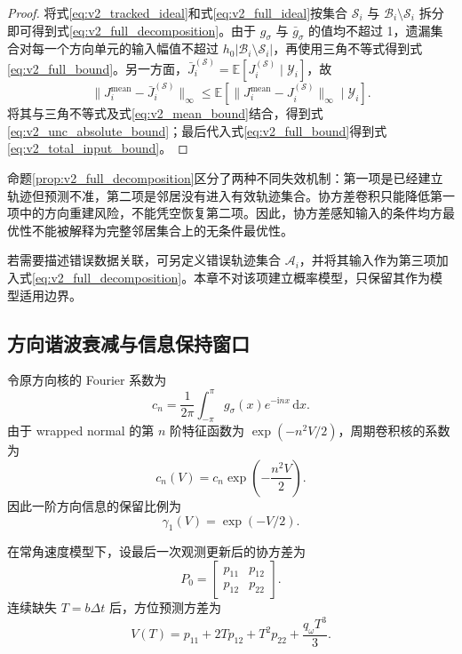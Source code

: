 \documentclass[UTF8,fontset=windows,11pt]{ctexart}
\newcommand{\E}{\mathbb E}
\begin{document}
\begin{proof}
将式\eqref{eq:v2_tracked_ideal}和式\eqref{eq:v2_full_ideal}按集合 $\mathcal S_i$ 与 $\mathcal B_i\setminus\mathcal S_i$ 拆分即可得到式\eqref{eq:v2_full_decomposition}。由于 $g_\sigma$ 与 $\bar g_\sigma$ 的值均不超过 1，遗漏集合对每一个方向单元的输入幅值不超过 $h_0|\mathcal B_i\setminus\mathcal S_i|$，再使用三角不等式得到式\eqref{eq:v2_full_bound}。另一方面，$\bar J_i^{(\mathcal S)}=\E[J_i^{(\mathcal S)}\mid\mathcal Y_i]$，故
\[
 \|J_i^{\mathrm{mean}}-\bar J_i^{(\mathcal S)}\|_\infty
 \le\E[\|J_i^{\mathrm{mean}}-J_i^{(\mathcal S)}\|_\infty\mid\mathcal Y_i].
\]
将其与三角不等式及式\eqref{eq:v2_mean_bound}结合，得到式\eqref{eq:v2_unc_absolute_bound}；最后代入式\eqref{eq:v2_full_bound}得到式\eqref{eq:v2_total_input_bound}。
\end{proof}

命题\ref{prop:v2_full_decomposition}区分了两种不同失效机制：第一项是已经建立轨迹但预测不准，第二项是邻居没有进入有效轨迹集合。协方差卷积只能降低第一项中的方向重建风险，不能凭空恢复第二项。因此，协方差感知输入的条件均方最优性不能被解释为完整邻居集合上的无条件最优性。

若需要描述错误数据关联，可另定义错误轨迹集合 $\mathcal A_i$，并将其输入作为第三项加入式\eqref{eq:v2_full_decomposition}。本章不对该项建立概率模型，只保留其作为模型适用边界。

\subsection{方向谐波衰减与信息保持窗口}

令原方向核的 Fourier 系数为
\begin{equation}
 c_n=\frac{1}{2\pi}\int_{-\pi}^{\pi}g_\sigma(x)e^{-\mathrm inx}\,\mathrm dx .
 \label{eq:v2_fourier_coeff}
\end{equation}
由于 wrapped normal 的第 $n$ 阶特征函数为 $\exp(-n^2V/2)$，周期卷积核的系数为
\begin{equation}
 c_n(V)=c_n\exp\left(-\frac{n^2V}{2}\right).
 \label{eq:v2_harmonic_decay}
\end{equation}
因此一阶方向信息的保留比例为
\begin{equation}
 \gamma_1(V)=\exp(-V/2).
 \label{eq:v2_first_harmonic}
\end{equation}

在常角速度模型下，设最后一次观测更新后的协方差为
\begin{equation}
 P_0=\begin{bmatrix}p_{11}&p_{12}\\p_{12}&p_{22}\end{bmatrix}.
 \label{eq:v2_p0}
\end{equation}
连续缺失 $T=b\Delta t$ 后，方位预测方差为
\begin{equation}
 V(T)=p_{11}+2Tp_{12}+T^2p_{22}+\frac{q_\omega T^3}{3}.
 \label{eq:v2_vt}
\end{equation}
\end{document}
